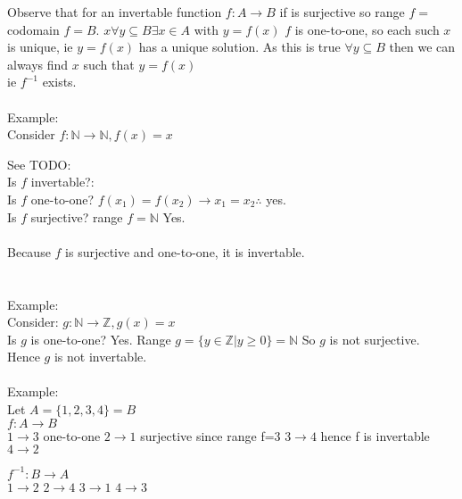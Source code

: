
Observe that for an invertable function $f: A \to B$ if is surjective so range $f = $ codomain $f = B$.
$x \forall y \subseteq B \exists x \in A$ with $y = f(x)$
$f$ is one-to-one, so each such $x$ is unique, ie $y = f(x)$ has a unique solution. As this is
true $\forall y \subseteq B$ then we can always find $x$ such that $y = f(x)$ \\
ie $f^{-1}$ exists.\\
\\
Example:\\
Consider $f: \mathbb{N} \to \mathbb{N}, f(x) = x$

See TODO:
\\
Is $f$ invertable?: \\
Is $f$ one-to-one? $f(x_1) = f(x_2) \to x_1 = x_2 \therefore$ yes. \\
Is $f$ surjective? range $f = \mathbb{N}$ Yes. \\
\\
Because $f$ is surjective and one-to-one, it is invertable.\\
\\
\\
Example: \\
Consider: $g: \mathbb{N} \to \mathbb{Z}, g(x) = x$ \\
Is $g$ is one-to-one? Yes.
Range $g = \{y \in \mathbb{Z} | y \geq 0\} = \mathbb{N}$
So $g$ is not surjective. Hence $g$ is not invertable.
\\
\\
Example:\\
Let $A = \{1,2,3,4\} = B$ \\
$f: A \to B$ \\ 
$1 \to 3$ one-to-one
$2 \to 1$ surjective since range f=3
$3 \to 4$ hence f is invertable
$4 \to 2$

$f^{-1}: B \to A$ \\
$1 \to 2$
$2 \to 4$
$3 \to 1$
$4 \to 3$

